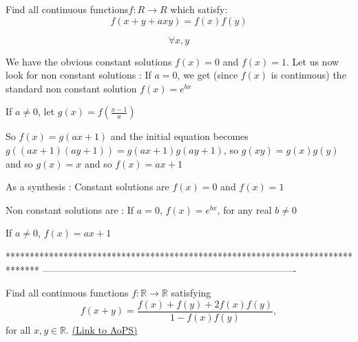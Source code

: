 \begin{solution}
	\begin{tcolorbox}Find all continuous functions$ f: R \to R$ which satisfy:
\[ f(x + y + axy) = f(x)f(y)
\]

\[ \forall x,y
\]
\end{tcolorbox}

We have the obvious constant solutions $ f(x)=0$ and $ f(x)=1$.  Let us now look for non constant solutions :
If $ a=0$, we get (since $ f(x)$ is continuous) the standard non constant solution  $ f(x)=e^{bx}$

If $ a\neq 0$, let $ g(x)=f(\frac{x-1}{a})$

So $ f(x)=g(ax+1)$ and the initial equation becomes $ g((ax+1)(ay+1))=g(ax+1)g(ay+1)$, so $ g(xy)=g(x)g(y)$ and so $ g(x)=x$ and so $ f(x)=ax+1$

As a synthesis :
Constant solutions are $ f(x)=0$ and $ f(x)=1$

Non constant solutions are :
If $ a=0$, $ f(x)=e^{bx}$, for any real $ b\neq 0$

If $ a\neq 0$, $ f(x)=ax+1$
\end{solution}
*******************************************************************************
-------------------------------------------------------------------------------

\begin{problem}
	Find all continuous functions $f: \mathbb R \to \mathbb R$ satisfying \[ f(x + y) = \frac{{f(x) + f(y) + 2f(x)f(y)}}{{1 - f(x)f(y)}},\]
for all $x, y \in \mathbb R$.
	\flushright \href{https://artofproblemsolving.com/community/c6h277437}{(Link to AoPS)}
\end{problem}



